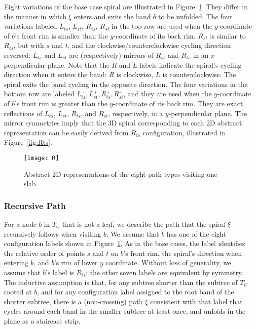 \documentclass[11pt]{article}
\begin{document}
Eight variations of the base case spiral are illustrated in Figure~\ref{fig:R}.
They differ in the manner in which $\xi$ enters and exits the band $b$ to be unfolded.
The four variations labeled $L_{ts}$, $L_{st}$, $R_{ts}$, $R_{st}$ in the top row are
used when the $y$-coordinate of $b$'s front rim is smaller than the $y$-coordinate of its back rim. $R_{st}$ is similar to $R_{ts}$, but with $s$ and $t$, and the clockwise/counterclockwise
cycling direction reversed; $L_{ts}$ and $L_{st}$ are (respectively) mirrors of
$R_{st}$ and $R_{ts}$ in an $x$-perpendicular plane. Note that the $R$ and $L$ labels indicate
the spiral's cycling direction when it enters the band: $R$ is clockwise,
$L$ is counterclockwise. The spiral exits the band cycling in the opposite direction.
The four variations in the bottom row
are labeled $L^{+}_{ts}, L^{+}_{st}, R^{+}_{ts}, R^{+}_{st}$, and they are
used when
the $y$-coordinate of $b$'s front rim is greater than the $y$-coordinate
of its back rim.
They are exact reflections of $L_{ts}$, $L_{st}$, $R_{ts}$, and $R_{st}$, respectively, in
a $y$-perpendicular plane.
The mirror symmetries imply that the 3D spiral corresponding to each 2D
abstract representation can be easily derived from $R_{ts}$ configuration, illustrated in Figure~\ref{fig:Rts}.
\begin{figure}[htbp]
\centering
\texttt{[image: R]}
\caption{Abstract 2D representations of the eight path types visiting one slab.}
\label{fig:R}
\end{figure}




\subsubsection{Recursive Path}
\label{sec:eps-recursive}

For a node $b$ in $T_U$ that is not a leaf, we describe the path that the spiral $\xi$
recursively follows when visiting $b$.
We assume that $b$ has one of the eight configuration
labels shown in Figure~\ref{fig:R}.
As in the base cases, the label
identifies the relative order of points $s$ and $t$ on $b$'s front rim, the spiral's direction
when entering $b$, and $b$'s rim of lower $y$ coordinate.
Without loss of generality, we assume that
$b$'s label is $R_{ts}$; the other seven labels are equivalent by symmetry.
The inductive assumption is
that, for any subtree shorter than the subtree of $T_U$ rooted at $b$, and for
any configuration label assigned to the root band of the shorter subtree,
there is a (non-crossing) path $\xi$ consistent with that label
that cycles around each band in the smaller subtree at least once,
and unfolds in the plane as a staircase strip.
\end{document}
